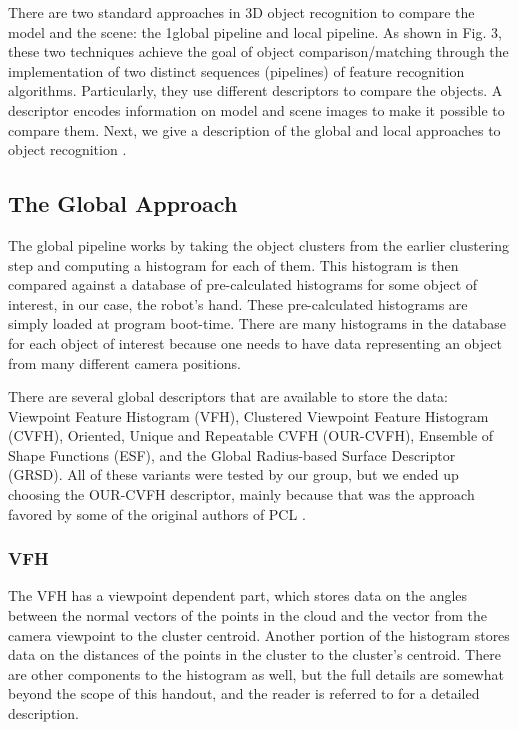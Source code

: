 \documentclass[journal]{IEEEtran}
\begin{document}
There are  two standard approaches in 3D object recognition to compare the model and the scene: the 1global pipeline and local pipeline. As shown in Fig. 3, these two techniques achieve the goal of object comparison/matching through the implementation of two distinct sequences (pipelines) of feature recognition algorithms. Particularly, they use different descriptors to compare the objects. A descriptor encodes information on model and scene images to make it possible to compare them. 
Next, we give a description of the global and local approaches to object recognition .
\subsection{The Global Approach}
The global pipeline works by taking the object clusters from the earlier clustering step and computing a histogram for each of them.  This histogram is then compared against a database of pre-calculated histograms for some object of interest, in our case, the robot's hand.  These pre-calculated histograms are simply loaded at program boot-time.  There are many histograms in the database for each object of interest because one needs to have data representing an object from many different camera positions.

There are several global descriptors that are available to store the data: Viewpoint Feature Histogram (VFH), Clustered Viewpoint Feature Histogram (CVFH), Oriented, Unique and Repeatable CVFH (OUR-CVFH), Ensemble of Shape Functions (ESF), and the Global Radius-based Surface Descriptor (GRSD).  All of these variants were tested by our group, but we ended up choosing the OUR-CVFH descriptor, mainly because that was the approach favored by some of the original authors of PCL \cite{aldoma4}.


\subsubsection{VFH}
The VFH has a viewpoint dependent part, which stores data on the angles between the normal vectors of the points in the cloud and the vector from the camera viewpoint to the cluster centroid.  Another portion of the histogram stores data on the distances of the points in the cluster to the cluster’s centroid.  There are other components to the histogram as well, but the full details are somewhat beyond the scope of this handout, and the reader is referred to \cite{clusterrec} for a detailed description. 
\end{document}
